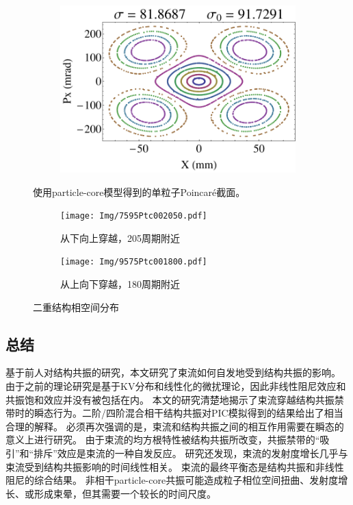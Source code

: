 \begin{figure}
\begin{subfigure}[b]{0.24\textwidth}
        \caption{}\label{sfig:TestPtc3}
    \end{subfigure}
    \begin{subfigure}[b]{0.24\textwidth}
        \includegraphics[width=\textwidth]{Img/TestParticle4.pdf}
        \caption{}\label{sfig:TestPtc4}
    \end{subfigure}
    \caption{使用particle-core模型得到的单粒子Poincar\'{e}截面。}
    \label{fig:TestPtc}
\end{figure}

\begin{figure}[!hbp]
    \centering
    \begin{subfigure}[b]{0.45\textwidth}
        \texttt{[image: Img/7595Ptc002050.pdf]}
        \caption{从下向上穿越，205周期附近}
        \label{sfig:Ptc2tails1}
    \end{subfigure}
    \begin{subfigure}[b]{0.45\textwidth}
        \texttt{[image: Img/9575Ptc001800.pdf]}
        \caption{从上向下穿越，180周期附近}
        \label{sfig:Ptc2tails2}
    \end{subfigure}
    \caption{二重结构相空间分布}
    \label{fig:Ptc2tail}
\end{figure}


\subsection{总结}
\label{section:Crossing_Summary}
基于前人对结构共振的研究，本文研究了束流如何自发地受到结构共振的影响。
由于之前的理论研究是基于KV分布和线性化的微扰理论，因此非线性阻尼效应和共振饱和效应并没有被包括在内。
本文的研究清楚地揭示了束流穿越结构共振禁带时的瞬态行为。二阶/四阶混合相干结构共振对PIC模拟得到的结果给出了相当合理的解释。
必须再次强调的是，束流和结构共振之间的相互作用需要在瞬态的意义上进行研究。
由于束流的均方根特性被结构共振所改变，共振禁带的“吸引”和“排斥”效应是束流的一种自发反应。
研究还发现，束流的发射度增长几乎与束流受到结构共振影响的时间线性相关。
束流的最终平衡态是结构共振和非线性阻尼的综合结果。
非相干particle-core共振可能造成粒子相位空间扭曲、发射度增长、或形成束晕，但其需要一个较长的时间尺度。

